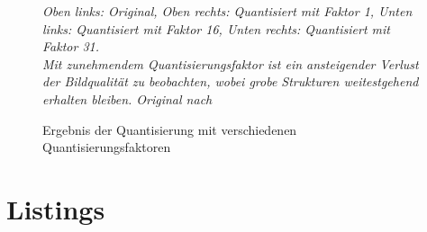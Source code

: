 \begin{figure}[h!]
    \caption{Ergebnis der Quantisierung mit verschiedenen Quantisierungsfaktoren}
    \textit{Oben links: Original, Oben rechts: Quantisiert mit Faktor 1, Unten links: Quantisiert mit Faktor 16, Unten rechts: Quantisiert mit Faktor 31.\\
    Mit zunehmendem Quantisierungsfaktor ist ein ansteigender Verlust der Bildqualität zu beobachten, wobei grobe Strukturen weitestgehend erhalten bleiben. Original nach \cite{brooke_cagle__2016}}
    \label{fig:quantization_multi_mquants}
\end{figure}



\chapter{Listings}


\newpage

